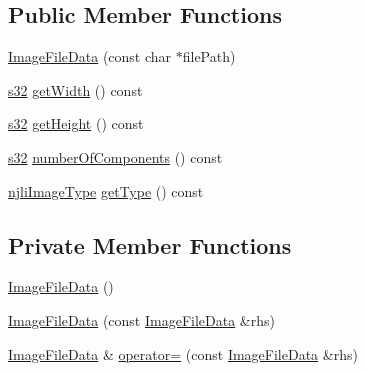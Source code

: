 \subsection*{Public Member Functions}
\begin{DoxyCompactItemize}
\item 
\mbox{\hyperlink{structnjli_1_1_world_resource_loader_1_1_image_file_data_a95f67fd2dcd6fd0576e1c48f6bff3ede}{Image\+File\+Data}} (const char $\ast$file\+Path)
\item 
\mbox{\hyperlink{_util_8h_aa62c75d314a0d1f37f79c4b73b2292e2}{s32}} \mbox{\hyperlink{structnjli_1_1_world_resource_loader_1_1_image_file_data_a1e51099f69390607836390e148784adb}{get\+Width}} () const
\item 
\mbox{\hyperlink{_util_8h_aa62c75d314a0d1f37f79c4b73b2292e2}{s32}} \mbox{\hyperlink{structnjli_1_1_world_resource_loader_1_1_image_file_data_a9dc7ec4a1ac3681864fd61c9c36bba61}{get\+Height}} () const
\item 
\mbox{\hyperlink{_util_8h_aa62c75d314a0d1f37f79c4b73b2292e2}{s32}} \mbox{\hyperlink{structnjli_1_1_world_resource_loader_1_1_image_file_data_aa129fc2197bbdd87c4fd638046b8a6d6}{number\+Of\+Components}} () const
\item 
\mbox{\hyperlink{namespacenjli_a709a24b63b768ce1cdff54f7f48d3c0b}{njli\+Image\+Type}} \mbox{\hyperlink{structnjli_1_1_world_resource_loader_1_1_image_file_data_ab96e370ca14576a57409c59e8d4cf73b}{get\+Type}} () const
\end{DoxyCompactItemize}
\subsection*{Private Member Functions}
\begin{DoxyCompactItemize}
\item 
\mbox{\hyperlink{structnjli_1_1_world_resource_loader_1_1_image_file_data_a7732607f7836d9ac9091c6dbc042ae0a}{Image\+File\+Data}} ()
\item 
\mbox{\hyperlink{structnjli_1_1_world_resource_loader_1_1_image_file_data_a7f227092eae4776b8144965bb1466d92}{Image\+File\+Data}} (const \mbox{\hyperlink{structnjli_1_1_world_resource_loader_1_1_image_file_data}{Image\+File\+Data}} \&rhs)
\item 
\mbox{\hyperlink{structnjli_1_1_world_resource_loader_1_1_image_file_data}{Image\+File\+Data}} \& \mbox{\hyperlink{structnjli_1_1_world_resource_loader_1_1_image_file_data_ae58cbe419624246b9d5c10fad222b6af}{operator=}} (const \mbox{\hyperlink{structnjli_1_1_world_resource_loader_1_1_image_file_data}{Image\+File\+Data}} \&rhs)
\end{DoxyCompactItemize}
